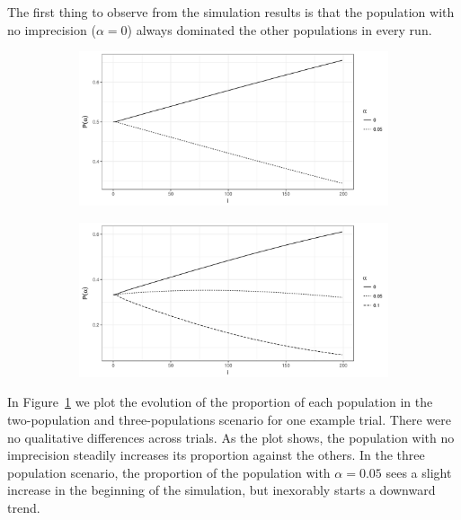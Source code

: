 \documentclass[a4paper]{article}
\begin{document}
The first thing to observe from the simulation results is that the population with no imprecision ($\alpha = 0$) always dominated the other populations in every run.
\begin{figure}
  \centering
  \begin{subfigure}[]{0.45\textwidth}
    \includegraphics[width=\textwidth]{simulation/results/round-3/plots/proportion-example-0-005-strong.png}
  \end{subfigure}
  \hfill
  \begin{subfigure}[]{0.45\textwidth}
    \includegraphics[width=\textwidth]{simulation/results/round-3/plots/proportion-example-0-005-01-strong.png}
  \end{subfigure}
  \caption{}
  \label{fig:examples-proportion-tight-interaction}
\end{figure}
In Figure~\ref{fig:examples-proportion-tight-interaction} we plot the evolution of the proportion of each population in the two-population and three-populations scenario for one example trial.
There were no qualitative differences across trials.
As the plot shows, the population with no imprecision steadily increases its proportion against the others.
In the three population scenario, the proportion of the population with $\alpha = 0.05$ sees a slight increase in the beginning of the simulation, but inexorably starts a downward trend.
\end{document}
